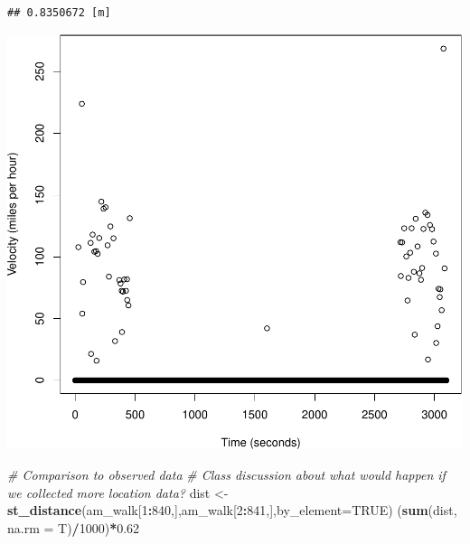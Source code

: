 \documentclass[
]{book}
\newenvironment{Shaded}{\begin{snugshade}}{\end{snugshade}}
\newcommand{\AttributeTok}[1]{\textcolor[rgb]{0.13,0.29,0.53}{#1}}
\newcommand{\CommentTok}[1]{\textcolor[rgb]{0.56,0.35,0.01}{\textit{#1}}}
\newcommand{\ConstantTok}[1]{\textcolor[rgb]{0.56,0.35,0.01}{#1}}
\newcommand{\DecValTok}[1]{\textcolor[rgb]{0.00,0.00,0.81}{#1}}
\newcommand{\FloatTok}[1]{\textcolor[rgb]{0.00,0.00,0.81}{#1}}
\newcommand{\FunctionTok}[1]{\textcolor[rgb]{0.13,0.29,0.53}{\textbf{#1}}}
\newcommand{\NormalTok}[1]{#1}
\newcommand{\OtherTok}[1]{\textcolor[rgb]{0.56,0.35,0.01}{#1}}
\newcommand{\SpecialCharTok}[1]{\textcolor[rgb]{0.81,0.36,0.00}{\textbf{#1}}}
\newcommand{\StringTok}[1]{\textcolor[rgb]{0.31,0.60,0.02}{#1}}
\begin{document}
\begin{verbatim}
## 0.8350672 [m]
\end{verbatim}

\begin{Shaded}
\end{Shaded}

\includegraphics{_main_files/figure-latex/unnamed-chunk-9-2.pdf}

\begin{Shaded}
\begin{Highlighting}[]
\CommentTok{\# Comparison to observed data}
\CommentTok{\# Class discussion about what would happen if we collected more location data?}
\NormalTok{dist }\OtherTok{\textless{}{-}} \FunctionTok{st\_distance}\NormalTok{(am\_walk[}\DecValTok{1}\SpecialCharTok{:}\DecValTok{840}\NormalTok{,],am\_walk[}\DecValTok{2}\SpecialCharTok{:}\DecValTok{841}\NormalTok{,],}\AttributeTok{by\_element=}\ConstantTok{TRUE}\NormalTok{)}
\NormalTok{(}\FunctionTok{sum}\NormalTok{(dist, }\AttributeTok{na.rm =}\NormalTok{ T)}\SpecialCharTok{/}\DecValTok{1000}\NormalTok{)}\SpecialCharTok{*}\FloatTok{0.62}
\end{Highlighting}
\end{Shaded}
\end{document}
